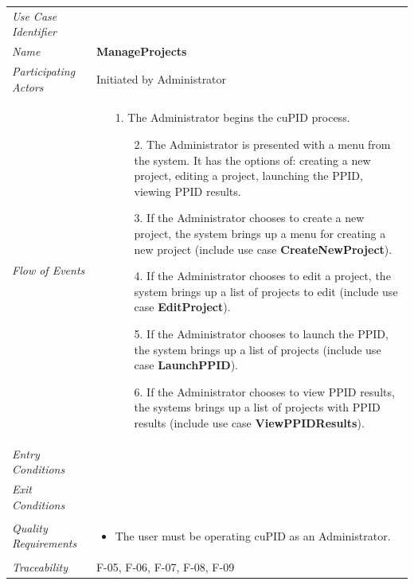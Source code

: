 \documentclass[12pt,letterpaper]{article}
\begin{document}
\begin{center}
    \begin{tabu} to 
        \toprule
		Use Case Identifier & \manageprojects{} \\
		Name & {\bf ManageProjects} \\
        Participating Actors & Initiated by Administrator \\
		Flow of Events & 
	    \begin{enumerate}[topsep=-1em]
		    \item[1.] The Administrator begins the cuPID process.
			\begin{enumerate}
				\item[2.] The Administrator is presented with a menu from the system. It has the options of: creating a new project, editing a project, launching the PPID, viewing PPID results.
				\item[3.] If the Administrator chooses to create a new project, the system brings up a menu for creating a new project (include use case \textbf{CreateNewProject}).
				\item[4.] If the Administrator chooses to edit a project, the system brings up a list of projects to edit (include use case \textbf{EditProject}).
				\item[5.] If the Administrator chooses to launch the PPID, the system brings up a list of projects (include use case \textbf{LaunchPPID}).
				\item[6.] If the Administrator chooses to view PPID results, the systems brings up a list of projects with PPID results (include use case \textbf{ViewPPIDResults}).
			\end{enumerate}
		\end{enumerate} \\

		Entry Conditions & \\

		Exit Conditions & \\

		Quality Requirements &
		\begin{itemize}[topsep=-1em]
		    \item The user must be operating cuPID as an Administrator. 
        \end{itemize} \\

		Traceability & F-05, F-06, F-07, F-08, F-09\\
        \toprule
    \end{tabu}
\end{center}
\end{document}
